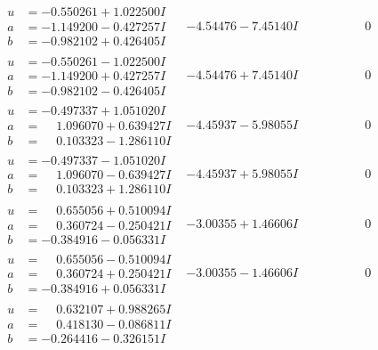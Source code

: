 \documentclass[1p]{elsarticle_modified}
\theoremstyle{definition}
\begin{document}
$$\begin{array}{c|c|c}
 \hline 
\begin{aligned}
u &= -0.550261 + 1.022500 I \\
a &= -1.149200 - 0.427257 I \\
b &= -0.982102 + 0.426405 I\end{aligned}
 & -4.54476 - 7.45140 I & \phantom{-0.000000 } 0 \\ \hline\begin{aligned}
u &= -0.550261 - 1.022500 I \\
a &= -1.149200 + 0.427257 I \\
b &= -0.982102 - 0.426405 I\end{aligned}
 & -4.54476 + 7.45140 I & \phantom{-0.000000 } 0 \\ \hline\begin{aligned}
u &= -0.497337 + 1.051020 I \\
a &= \phantom{-}1.096070 + 0.639427 I \\
b &= \phantom{-}0.103323 - 1.286110 I\end{aligned}
 & -4.45937 - 5.98055 I & \phantom{-0.000000 } 0 \\ \hline\begin{aligned}
u &= -0.497337 - 1.051020 I \\
a &= \phantom{-}1.096070 - 0.639427 I \\
b &= \phantom{-}0.103323 + 1.286110 I\end{aligned}
 & -4.45937 + 5.98055 I & \phantom{-0.000000 } 0 \\ \hline\begin{aligned}
u &= \phantom{-}0.655056 + 0.510094 I \\
a &= \phantom{-}0.360724 - 0.250421 I \\
b &= -0.384916 - 0.056331 I\end{aligned}
 & -3.00355 + 1.46606 I & \phantom{-0.000000 } 0 \\ \hline\begin{aligned}
u &= \phantom{-}0.655056 - 0.510094 I \\
a &= \phantom{-}0.360724 + 0.250421 I \\
b &= -0.384916 + 0.056331 I\end{aligned}
 & -3.00355 - 1.46606 I & \phantom{-0.000000 } 0 \\ \hline\begin{aligned}
u &= \phantom{-}0.632107 + 0.988265 I \\
a &= \phantom{-}0.418130 - 0.086811 I \\
b &= -0.264416 - 0.326151 I\end{aligned}

\end{array}$$
\end{document}
